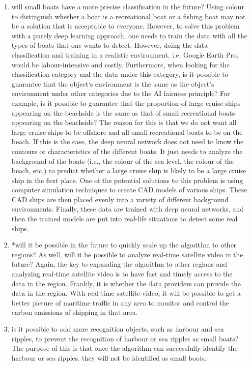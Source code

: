 \begin{enumerate}
    \item will small boats have a more precise classification in the future? Using colour to distinguish whether a boat is a recreational boat or a fishing boat may not be a solution that is acceptable to everyone. However, to solve this problem with a purely deep learning approach, one needs to train the data with all the types of boats that one wants to detect. However, doing the data classification and training in a realistic environment, i.e. Google Earth Pro, would be labour-intensive and costly. Furthermore, when looking for the classification category and the data under this category, is it possible to guarantee that the object‘s environment is the same as the object's environment under other categories due to the AI fairness principle? For example, is it possible to guarantee that the proportion of large cruise ships appearing on the beachside is the same as that of small recreational boats appearing on the beachside? The reason for this is that we do not want all large cruise ships to be offshore and all small recreational boats to be on the beach. If this is the case, the deep neural network does not need to know the contours or characteristics of the different boats. It just needs to analyze the background of the boats (i.e., the colour of the sea level, the colour of the beach, etc.) to predict whether a large cruise ship is likely to be a large cruise ship in the first place. One of the potential solutions to this problem is using computer simulation techniques to create CAD models of various ships. These CAD ships are then placed evenly into a variety of different background environments. Finally, these data are trained with deep neural networks, and then the trained models are put into real-life situations to detect some real ships.
    
    \item *will it be possible in the future to quickly scale up the algorithm to other regions? As well, will it be possible to analyze real-time satellite video in the future? Again, the key to expanding the algorithm to other regions and analyzing real-time satellite video is to have fast and timely access to the data in the region. Frankly, it is whether the data providers can provide the data in the region. With real-time satellite video, it will be possible to get a better picture of maritime traffic in any area to monitor and control the carbon emissions of shipping in that area.
    
    \item is it possible to add more recognition objects, such as harbour and sea ripples, to prevent the recognition of harbour or sea ripples as small boats? The purpose of this is that once the algorithm can successfully identify the harbour or sea ripples, they will not be identified as small boats.
    

\end{enumerate}
